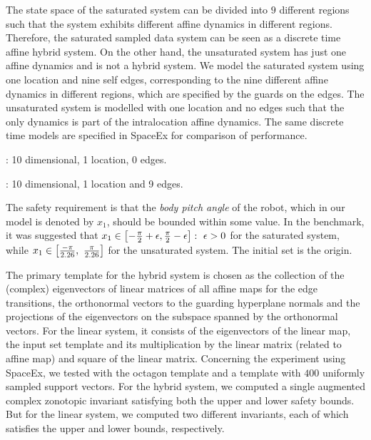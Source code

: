 
The state space of the saturated system can be divided into $9$
different regions such that the system exhibits different affine
dynamics in different regions. Therefore, the saturated sampled data
system can be seen as a discrete time affine hybrid system.  On the
other hand, the unsaturated system has just one affine dynamics and is
not a hybrid system.  We model the saturated system using one location
and nine self edges, corresponding to the nine different affine
dynamics in different regions, which are specified by the guards on
the edges.  The unsaturated system is modelled with one location and no
edges such that the only dynamics is part of the intralocation affine
dynamics. The same discrete time models are specified in SpaceEx for
comparison of performance.


: 10 dimensional, 1 location, 0 edges.

: 10 dimensional, 1 location and 9 edges.

The safety requirement is that the \emph{body pitch angle} of the
robot, which in our model is denoted by $x_1$, should be bounded
within some value. In the benchmark, it was suggested that
$x_1\in\left[-\frac{\pi}{2}+\epsilon,\frac{\pi}{2}-\epsilon\right]:~\epsilon>0$
for the saturated system, while
$x_1\in\left[\frac{-\pi}{2.26},~\frac{\pi}{2.26}\right]$ for the
unsaturated system. The initial set is the origin.
\smallskip

  The primary template for the hybrid system is
chosen as the collection of the (complex) eigenvectors of linear
matrices of all affine maps for the edge transitions, the orthonormal
vectors to the guarding hyperplane normals and the projections of the
eigenvectors on the subspace spanned by the orthonormal vectors.  For
the linear system, it consists of the eigenvectors of the linear map,
the input set template and its multiplication by the linear matrix
(related to affine map) and square of the linear matrix. Concerning the experiment using
SpaceEx, we tested with the octagon template and a
template with $400$ uniformly sampled support vectors.  For the hybrid
system, we computed a single augmented complex zonotopic invariant
satisfying both the upper and lower safety bounds.  But for the linear
system, we computed two different invariants, each of which satisfies the
upper and lower bounds, respectively.

